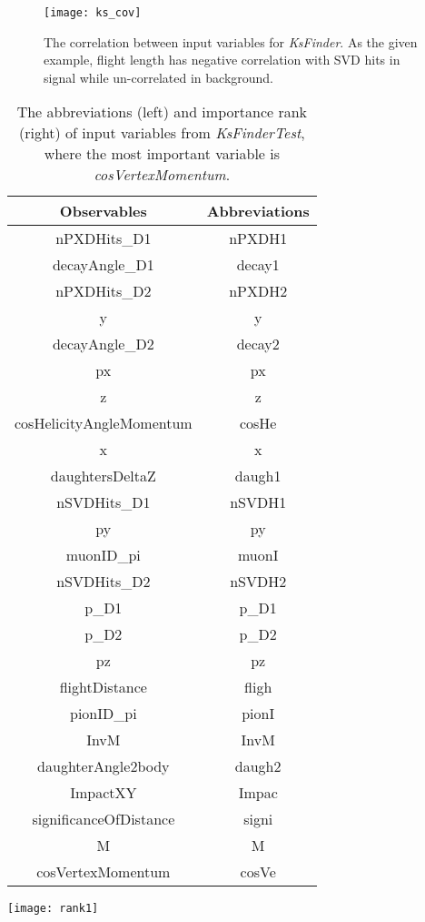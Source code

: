 \begin{figure}[ht]
\centering
\texttt{[image: ks\_cov]}
\caption{The correlation between input variables for \textit{KsFinder}. As the given example, flight length has negative correlation with SVD hits in signal while un-correlated in background.}
\label{fig:ks_cov}
\end{figure}

 \begin{table}[htpb]
 	\begin{minipage}[ht]{0.5\linewidth}
 		\centering
 		\begin{tabular}{c|c}
 			\hline
 			Observables &  Abbreviations\\
 			\hline
 			nPXDHits\_D1 &  nPXDH1 \\
 			decayAngle\_D1 & decay1 \\
 			nPXDHits\_D2 & nPXDH2\\
 			y & y \\
 			decayAngle\_D2 & decay2\\
 			px & px\\
 			z & z \\
 			cosHelicityAngleMomentum & cosHe\\
 			x & x \\
 			daughtersDeltaZ & daugh1\\
 			nSVDHits\_D1 & nSVDH1\\
 			py & py\\
 			muonID\_pi & muonI\\
 			nSVDHits\_D2 & nSVDH2\\
 			p\_D1 & p\_D1\\
 			p\_D2 & p\_D2\\
 			pz & pz \\
 			flightDistance & fligh\\
 			pionID\_pi & pionI\\
 			InvM & InvM \\
 			daughterAngle2body & daugh2\\
 			ImpactXY & Impac \\
 			significanceOfDistance & signi \\
 			M & M \\
 			cosVertexMomentum & cosVe \\
 			\hline
 		\end{tabular}
 	\end{minipage}
 	\begin{minipage}[ht]{0.5\linewidth}
 		\centering 
 		\texttt{[image: rank1]}
 	\end{minipage}
 \caption{The abbreviations (left) and importance rank (right) of input variables from \textit{KsFinderTest}, where the most important variable is \textit{cosVertexMomentum}.}
 \label{tab:ks_import}
 \end{table}




